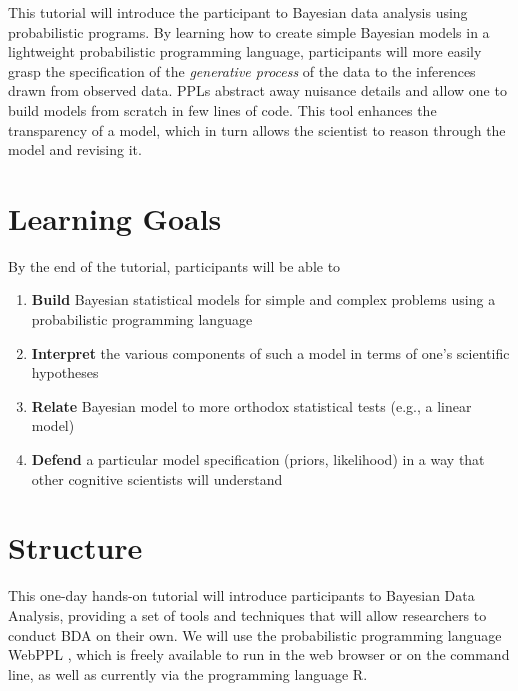 \documentclass[10pt,letterpaper]{article}
\providecommand{\tightlist}{%
  \setlength{\itemsep}{0pt}\setlength{\parskip}{0pt}}
\begin{document}
This tutorial will introduce the participant to Bayesian data analysis using probabilistic programs. 
By learning how to create simple Bayesian models in a lightweight probabilistic programming language, participants will more easily grasp the specification of the \emph{generative process} of the data to the inferences drawn from observed data.
PPLs abstract away nuisance details and allow one to build models from scratch in few lines of code. 
This tool enhances the transparency of a model, which in turn allows the scientist to reason through the model and revising it. 


\section{Learning Goals}

By the end of the tutorial, participants will be able to 

\begin{enumerate}
\tightlist
\item \textbf{Build} Bayesian statistical models for simple and complex problems using a probabilistic programming language 
\item \textbf{Interpret} the various components of such a model in terms of one's scientific hypotheses 
\item \textbf{Relate} Bayesian model to more orthodox statistical tests (e.g., a linear model) 
\item \textbf{Defend} a particular model specification (priors, likelihood) in a way that other cognitive scientists will understand
\end{enumerate}

\section{Structure}

This one-day hands-on tutorial will introduce participants to Bayesian Data Analysis, providing a set of tools and techniques that will allow researchers to conduct BDA on their own. 
We will use the probabilistic programming language WebPPL \cite{dippl}, which is freely available to run in the web browser or on the command line, as well as currently via the programming language R. 
\end{document}
